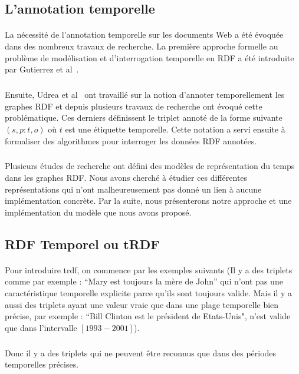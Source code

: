 \documentclass[12pt,a4]{report}
\begin{document}
\subsection{L'annotation temporelle}
\paragraph{}
La nécessité de l’annotation temporelle sur les documents Web a été évoquée dans des nombreux travaux de recherche. La première approche formelle au problème de modélisation et d’interrogation temporelle en RDF a été introduite par Gutierrez et al~\cite{gutierrez2005}.
\subparagraph{}
Ensuite, Udrea et al~\cite{udrea2006} ont travaillé sur la notion d'annoter temporellement les graphes RDF et depuis plusieurs travaux de recherche ont évoqué cette problématique.
Ces derniers définissent le triplet annoté de la forme suivante $(s,p:t,o)$ où $t$ est une étiquette temporelle. Cette notation a servi ensuite à formaliser des algorithmes pour interroger les données RDF annotées.
\subparagraph{}	
Plusieurs études de recherche ont défini des modèles de représentation du temps dans les graphes RDF. Nous avons cherché à étudier ces différentes représentations qui n'ont malheureusement pas donné un lien à aucune implémentation concrète. Par la suite, nous présenterons notre approche et une implémentation du modèle que nous avons proposé.  
\subsection{RDF Temporel ou tRDF}
\paragraph{}
Pour introduire \gls{trdf}, on commence par les exemples suivants (Il y a des triplets comme par exemple : ``Mary est toujours la mère de John'' qui n'ont pas une caractéristique temporelle explicite parce qu’ils sont toujours valide. Mais il y a aussi des triplets ayant une valeur vraie que dans une plage temporelle bien précise, par exemple : ``Bill Clinton est le président de Etats-Unis", n'est valide que dans l'intervalle $[1993-2001]$).
\subparagraph{}
Donc il y a des triplets qui ne peuvent être reconnus que dans des périodes temporelles précises.
\end{document}
